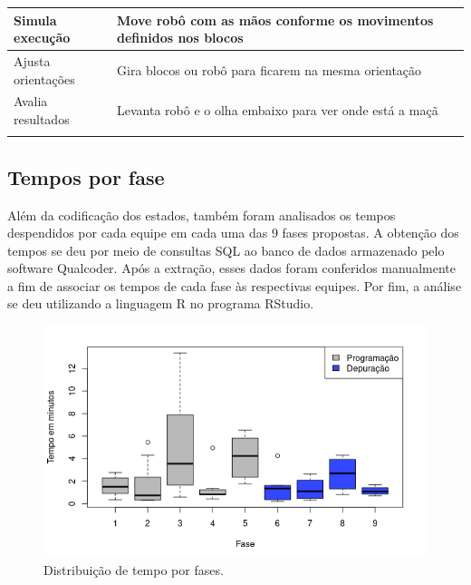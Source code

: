 \begin{quadro}[!h]
\begin{table_env}
\begin{tabular}{@{}l m{} c@{}}
        
        
        
        
        Simula execução & Move robô com as mãos conforme os movimentos definidos nos blocos \\ \hline
        
        
        Ajusta orientações & Gira blocos ou robô para ficarem na mesma orientação \\ \hline
        Avalia resultados & Levanta robô e o olha embaixo para ver onde está a maçã \\ \hline
        
        
        \\ \bottomrule
        \end{tabular}
    \end{table_env}
    \sourceauthor
 \end{quadro}


 \subsection{Tempos por fase}

Além da codificação dos estados, também foram analisados os tempos despendidos por cada equipe em cada uma das 9 fases propostas. A obtenção dos tempos se deu por meio de consultas SQL ao banco de dados armazenado pelo software Qualcoder. Após a extração, esses dados foram conferidos manualmente a fim de associar os tempos de cada fase às respectivas equipes. Por fim, a análise se deu utilizando a linguagem R no programa RStudio. 

 \begin{figure}[!htpb]
    \centering
    \includegraphics[width=.6\linewidth,fbox]{figs/tempos_por_tarefa.png}
    \caption{Distribuição de tempo por fases.}
    \sourceauthor
    \label{fig:tempo_tarefa}
\end{figure}

